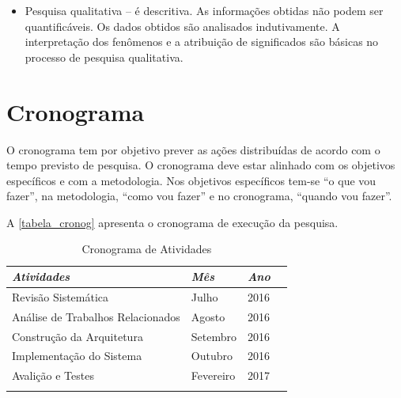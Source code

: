 \documentclass[
12pt,				%
openright,			%
oneside,
a4paper,			%
english,			%
french,				%
spanish,			%
brazil,				%
]{abntex2}
\begin{document}
\begin{enumerate}
\begin{enumerate}
\begin{itemize}
				\item Pesquisa qualitativa – é descritiva. As informações obtidas não podem ser quantificáveis. Os dados obtidos são analisados indutivamente. A interpretação dos fenômenos e a atribuição de significados são básicas no processo de pesquisa qualitativa. 
			\end{itemize}
		\end{enumerate}
	\end{enumerate}
	
	
	\chapter{Cronograma}
	
	O cronograma tem por objetivo prever as ações distribuídas de acordo com o tempo previsto de pesquisa. O cronograma deve estar alinhado com os objetivos específicos e com a metodologia. Nos objetivos específicos tem-se “o que vou fazer”, na metodologia, “como vou fazer” e no cronograma, “quando vou fazer”.
	
	A  \autoref{tabela_cronog} apresenta o cronograma de execução da pesquisa. 
	
	\begin{table}[!htb]
		\centering
		\caption{Cronograma de Atividades}
		\label{tabela_cronog}
		\begin{tabular}{@{}llll@{}}
			\toprule
			\textit{Atividades}                  & \textit{Mês}       & \textit{Ano}   \\ \midrule
			Revisão Sistemática                  & Julho              & 2016      \\
			Análise de Trabalhos Relacionados    & Agosto             & 2016      \\
			Construção da Arquitetura            & Setembro           & 2016      \\
			Implementação do Sistema             & Outubro            & 2016      \\
			Avalição e Testes                    & Fevereiro          & 2017      \\
			&                    &           \\ \bottomrule
		\end{tabular}
	\end{table}
	
	
	
	
	
\end{document}
